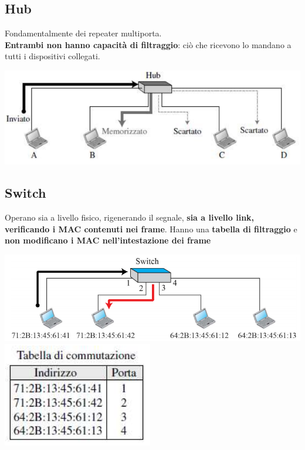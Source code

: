 \documentclass[10pt]{article}
\begin{document}
\subsection{Hub}
Fondamentalmente dei repeater multiporta.\\
\textbf{Entrambi non hanno capacità di filtraggio}: ciò che ricevono lo mandano a tutti i dispositivi collegati.
\begin{center}
\includegraphics[scale=0.7]{hub.png}
\end{center}
\subsection{Switch}
Operano sia a livello fisico, rigenerando il segnale, \textbf{sia a livello link, verificando i MAC contenuti nei frame}. Hanno una \textbf{tabella di filtraggio} e \textbf{non modificano i MAC nell'intestazione dei frame}
\begin{center}
\includegraphics[scale=0.6]{switch.png}\includegraphics[scale=0.6]{switchtab.png}
\end{center}
\end{document}
